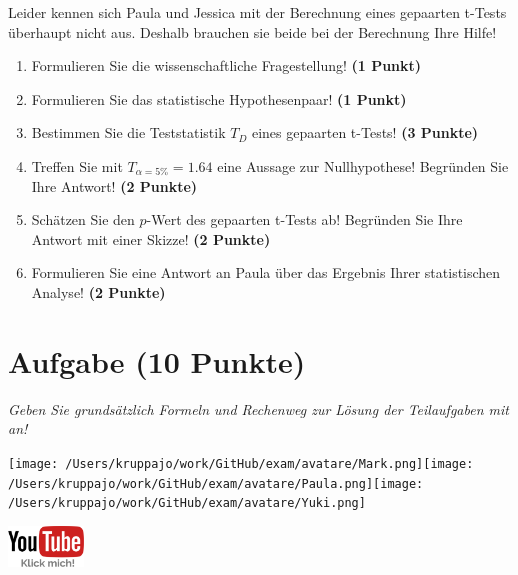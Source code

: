 \documentclass[a4paper, 9pt]{scrartcl}\usepackage[]{graphicx}\usepackage[]{xcolor}
\begin{document}
Leider kennen sich Paula und Jessica mit der Berechnung eines gepaarten t-Tests überhaupt nicht aus. Deshalb brauchen sie beide bei der Berechnung Ihre Hilfe!

\begin{enumerate}
  \item Formulieren Sie die wissenschaftliche Fragestellung! \textbf{(1 Punkt)}
  \item Formulieren Sie das statistische Hypothesenpaar! \textbf{(1 Punkt)}
  \item Bestimmen Sie die Teststatistik $T_{D}$ eines gepaarten t-Tests! \textbf{(3 Punkte)}
  \item Treffen Sie mit $T_{\alpha = 5\%} = 1.64$ eine Aussage zur Nullhypothese! Begründen Sie Ihre Antwort! \textbf{(2 Punkte)}
\item Schätzen Sie den $p$-Wert des gepaarten t-Tests ab! Begründen Sie Ihre Antwort mit einer Skizze! \textbf{(2 Punkte)}
\item Formulieren Sie eine Antwort an Paula über das Ergebnis Ihrer statistischen Analyse! \textbf{(2 Punkte)}
\end{enumerate}


 
\clearpage

\section{Aufgabe \hfill (10 Punkte)}

\textit{Geben Sie grundsätzlich Formeln und Rechenweg zur Lösung der Teilaufgaben mit an!} \\[1Ex]
 

 
\begin{minipage}[t]{0.5\textwidth}
\texttt{[image: /Users/kruppajo/work/GitHub/exam/avatare/Mark.png]}\hspace{-4mm}\texttt{[image: /Users/kruppajo/work/GitHub/exam/avatare/Paula.png]}\hspace{-4mm}\texttt{[image: /Users/kruppajo/work/GitHub/exam/avatare/Yuki.png]}
\end{minipage}
\begin{minipage}[t]{0.5\textwidth}
\hfill
\href{https://youtu.be/exDo7AyHl4Q}{\includegraphics[width = 2cm]{img/youtube}}
\end{minipage}
\end{document}
